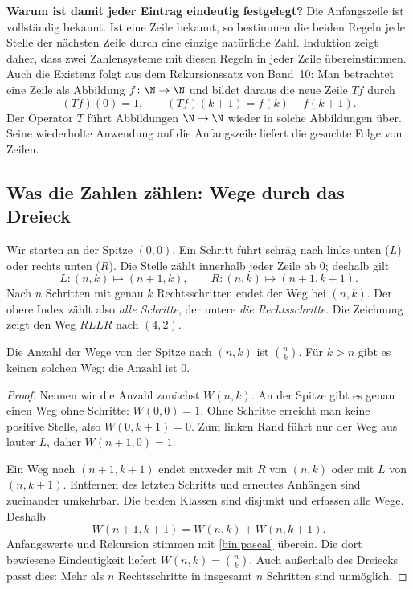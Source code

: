 \textbf{Warum ist damit jeder Eintrag eindeutig festgelegt?}
Die Anfangszeile ist vollständig bekannt. Ist eine Zeile bekannt,
so bestimmen die beiden Regeln jede Stelle der nächsten Zeile durch
eine einzige natürliche Zahl. Induktion zeigt daher, dass zwei
Zahlensysteme mit diesen Regeln in jeder Zeile übereinstimmen.
Auch die Existenz folgt aus dem Rekursionssatz von Band~10:
Man betrachtet eine Zeile als Abbildung $f\colon\N\to\N$ und bildet
daraus die neue Zeile $Tf$ durch
\[
 (Tf)(0)=1,\qquad (Tf)(k+1)=f(k)+f(k+1).
\]
Der Operator $T$ führt Abbildungen $\N\to\N$ wieder in solche
Abbildungen über. Seine wiederholte Anwendung auf die Anfangszeile
liefert die gesuchte Folge von Zeilen.

\subsection{Was die Zahlen zählen: Wege durch das Dreieck}
\label{bin:paths}

Wir starten an der Spitze $(0,0)$. Ein Schritt führt schräg nach links
unten ($L$) oder rechts unten ($R$). Die Stelle zählt innerhalb jeder
Zeile ab $0$; deshalb gilt
\[
 L:(n,k)\longmapsto(n+1,k),\qquad
 R:(n,k)\longmapsto(n+1,k+1).
\]
Nach $n$ Schritten mit genau $k$ Rechtsschritten endet der Weg bei
$(n,k)$. Der obere Index zählt also \emph{alle Schritte}, der untere
\emph{die Rechtsschritte}. Die Zeichnung zeigt den Weg $RLLR$ nach $(4,2)$.
\begin{center}\PascalWegeStart\end{center}

\begin{satz}[Wegeinterpretation]
Die Anzahl der Wege von der Spitze nach $(n,k)$ ist $\binom nk$.
Für $k>n$ gibt es keinen solchen Weg; die Anzahl ist $0$.
\end{satz}
\begin{proof}
Nennen wir die Anzahl zunächst $W(n,k)$. An der Spitze gibt es genau
einen Weg ohne Schritte: $W(0,0)=1$. Ohne Schritte erreicht man keine
positive Stelle, also $W(0,k+1)=0$. Zum linken Rand führt nur der Weg
aus lauter $L$, daher $W(n+1,0)=1$.

Ein Weg nach $(n+1,k+1)$ endet entweder mit $R$ von $(n,k)$ oder
mit $L$ von $(n,k+1)$. Entfernen des letzten Schritts und erneutes
Anhängen sind zueinander umkehrbar. Die beiden Klassen sind disjunkt
und erfassen alle Wege. Deshalb
\[
 W(n+1,k+1)=W(n,k)+W(n,k+1).
\]
Anfangswerte und Rekursion stimmen mit \eqref{bin:pascal} überein.
Die dort bewiesene Eindeutigkeit liefert $W(n,k)=\binom nk$.
Auch außerhalb des Dreiecks passt dies: Mehr als $n$ Rechtsschritte
in insgesamt $n$ Schritten sind unmöglich.
\end{proof}

